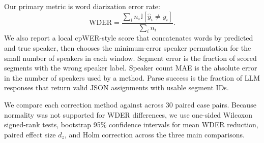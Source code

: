  Our primary metric is word diarization error rate:
\begin{equation}
    \mathrm{WDER} = \frac{\sum_i n_i \mathbb{I}[\hat{y}_i \neq y_i]}{\sum_i n_i}.
\end{equation}
We also report a local cpWER-style score that concatenates words by predicted and true speaker, then chooses the minimum-error speaker permutation for the small number of speakers in each window. Segment error is the fraction of scored segments with the wrong speaker label. Speaker count MAE is the absolute error in the number of speakers used by a method. Parse success is the fraction of LLM responses that return valid JSON assignments with usable segment IDs.

 We compare each correction method against \noisylabels across 30 paired case pairs. Because normality was not supported for WDER differences, we use one-sided Wilcoxon signed-rank tests, bootstrap 95\% confidence intervals for mean WDER reduction, paired effect size $d_z$, and Holm correction across the three main comparisons.
